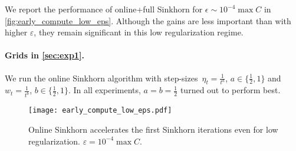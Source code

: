 We report the performance of online+full Sinkhorn for $\epsilon \sim 10^{-4}
\max C$ in \autoref{fig:early_compute_low_eps}. Although the gains are less
important than with higher $\varepsilon$, they remain significant in this low
regularization regime.

\paragraph{Grids in \autoref{sec:exp1}.} We run the online Sinkhorn algorithm
with step-sizes $\eta_t = \frac{1}{t^a}$, $a \in \{ \frac{1}{2}, 1 \}$
and $w_t = \frac{1}{{t^b}}$, $b \in \{ \frac{1}{2}, 1 \}$. In all
experiments, $a = b = \frac{1}{2}$ turned out to perform best.

\begin{figure}[ht]
    \centering
    \texttt{[image: early\_compute\_low\_eps.pdf]}
    \caption{Online Sinkhorn accelerates the first Sinkhorn iterations even for low regularization. $\varepsilon = 10^{-4} \max C$.}
    \label{fig:early_compute_low_eps}
\end{figure}
